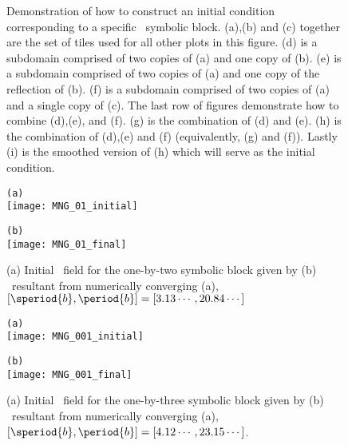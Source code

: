 \begin{itemize}
{\begin{figure}
\caption{ \label{fig:tilingschematic}
Demonstration of how to construct an initial condition corresponding to a specific
\spt\ symbolic block. (a),(b) and (c) together are the set of tiles used for all
other plots in this figure. (d) is a subdomain comprised of two copies of (a) and one copy of (b). (e) is a subdomain comprised of two copies of (a) and one copy of
the reflection of (b). (f) is a subdomain comprised of two copies of (a) and a
single copy of (c). The last row of figures demonstrate how to combine (d),(e),
and (f). (g) is the combination of (d) and (e). (h) is the combination of (d),(e)
and (f) (equivalently, (g) and (f)). Lastly (i) is the smoothed version of (h) which will serve as the initial condition.
}
\end{figure}


\begin{figure}
\begin{minipage}[height=.4\textheight]{.5\textwidth}
\centering \small{\texttt{(a)}}\\
\texttt{[image: MNG\_01\_initial]}
\end{minipage}
\begin{minipage}[height=.4\textheight]{.5\textwidth}
\centering \small{\texttt{(b)}}\\
\texttt{[image: MNG\_01\_final]}
\end{minipage}
\caption{ \label{fig:block01}
(a) Initial \spt\ field for the one-by-two symbolic block given by 
(b) \twoT\ resultant from numerically converging (a),
$[\speriod{b},\period{b}]=[3.13\cdots,20.84\cdots]$
}
\end{figure}

\begin{figure}
\begin{minipage}[height=.4\textheight]{.5\textwidth}
\centering \small{\texttt{(a)}}\\
\texttt{[image: MNG\_001\_initial]}
\end{minipage}
\begin{minipage}[height=.4\textheight]{.5\textwidth}
\centering \small{\texttt{(b)}}\\
\texttt{[image: MNG\_001\_final]}
\end{minipage}
\caption{ \label{fig:block001}
(a) Initial \spt\ field for the one-by-three symbolic block given by 
(b) \twoT\ resultant from numerically converging (a),
$[\speriod{b},\period{b}]=[4.12\cdots,23.15\cdots ]$.
}
\end{figure}




}
\end{itemize}
